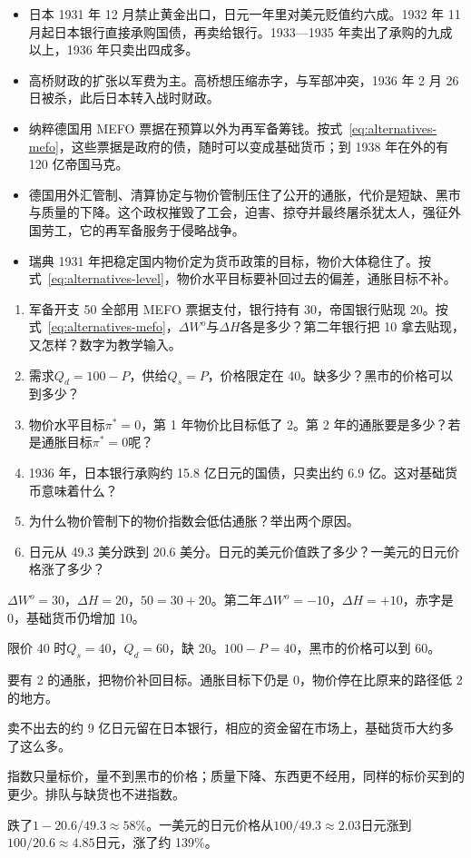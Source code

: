 \begin{takeaways}
\begin{itemize}
\item 日本 1931 年 12 月禁止黄金出口，日元一年里对美元贬值约六成。1932 年 11 月起日本银行直接承购国债，再卖给银行。1933—1935 年卖出了承购的九成以上，1936 年只卖出四成多。
\item 高桥财政的扩张以军费为主。高桥想压缩赤字，与军部冲突，1936 年 2 月 26 日被杀，此后日本转入战时财政。
\item 纳粹德国用 MEFO 票据在预算以外为再军备筹钱。按式~\eqref{eq:alternatives-mefo}，这些票据是政府的债，随时可以变成基础货币；到 1938 年在外的有 120 亿帝国马克。
\item 德国用外汇管制、清算协定与物价管制压住了公开的通胀，代价是短缺、黑市与质量的下降。这个政权摧毁了工会，迫害、掠夺并最终屠杀犹太人，强征外国劳工，它的再军备服务于侵略战争。
\item 瑞典 1931 年把稳定国内物价定为货币政策的目标，物价大体稳住了。按式~\eqref{eq:alternatives-level}，物价水平目标要补回过去的偏差，通胀目标不补。
\end{itemize}
\end{takeaways}

\begin{selfcheck}
\begin{enumerate}
\item 军备开支 50 全部用 MEFO 票据支付，银行持有 30，帝国银行贴现 20。按式~\eqref{eq:alternatives-mefo}，$\Delta W^{o}$与$\Delta H$各是多少？第二年银行把 10 拿去贴现，又怎样？数字为教学输入。
\item 需求$Q_d=100-P$，供给$Q_s=P$，价格限定在 40。缺多少？黑市的价格可以到多少？
\item 物价水平目标$\pi^{*}=0$，第 1 年物价比目标低了 2。第 2 年的通胀要是多少？若是通胀目标$\pi^{*}=0$呢？
\item 1936 年，日本银行承购约 15.8 亿日元的国债，只卖出约 6.9 亿。这对基础货币意味着什么？
\item 为什么物价管制下的物价指数会低估通胀？举出两个原因。
\item 日元从 49.3 美分跌到 20.6 美分。日元的美元价值跌了多少？一美元的日元价格涨了多少？
\end{enumerate}
\end{selfcheck}

\begin{answers}
\item $\Delta W^{o}=30$，$\Delta H=20$，$50=30+20$。第二年$\Delta W^{o}=-10$，$\Delta H=+10$，赤字是 0，基础货币仍增加 10。
\item 限价 40 时$Q_s=40$，$Q_d=60$，缺 20。$100-P=40$，黑市的价格可以到 60。
\item 要有 2 的通胀，把物价补回目标。通胀目标下仍是 0，物价停在比原来的路径低 2 的地方。
\item 卖不出去的约 9 亿日元留在日本银行，相应的资金留在市场上，基础货币大约多了这么多。
\item 指数只量标价，量不到黑市的价格；质量下降、东西更不经用，同样的标价买到的更少。排队与缺货也不进指数。
\item 跌了$1-20.6/49.3\approx58\%$。一美元的日元价格从$100/49.3\approx2.03$日元涨到$100/20.6\approx4.85$日元，涨了约 139\%。
\end{answers}


